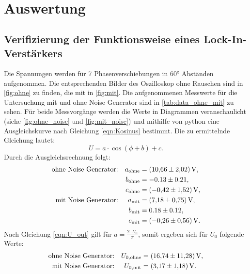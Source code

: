 \section{Auswertung}
\label{sec:Auswertung}

\subsection{Verifizierung der Funktionsweise eines Lock-In-Verstärkers}
\label{subsec:Verifizierung}
Die Spannungen werden für 7 Phasenverschiebungen in 60° Abständen aufgenommen.
Die entsprechenden Bilder des Oszilloskop ohne Rauschen sind in \autoref{fig:ohne} zu finden, die mit in \autoref{fig:mit}.
Die aufgenommenen Messwerte für die Untersuchung mit und ohne Noise Generator sind in \autoref{tab:data_ohne_mit} zu sehen.
Für beide Messvorgänge werden die Werte in Diagrammen veranschaulicht (siehe \autoref{fig:ohne_noise} und \autoref{fig:mit_noise}) und mithilfe von python eine Ausgleichskurve nach Gleichung \eqref{eqn:Kosinus} bestimmt.
Die zu ermittelnde Gleichung lautet:
\begin{equation*}
  U = a \cdot \cos(\phi + b) + c.
\end{equation*}
Durch die Ausgleichsrechnung folgt:
\begin{align*}
  \text{ohne Noise Generator:}&  &a_\text{ohne} &= \SI{10.66 \pm 2.02}{\volt}, \\
                              &  &b_\text{ohne} &= -0.13 \pm 0.21, \\
                              &  &c_\text{ohne} &= \SI{-0.42 \pm 1.52}{\volt}, \\
  \text{mit Noise Generator:}&   &a_\text{mit}  &= \SI{7.18 \pm 0.75}{\volt}, \\
                            &    &b_\text{mit} &=  0.18 \pm 0.12, \\
                            &    &c_\text{mit} &= \SI{-0.26 \pm 0.56}{\volt}.
\end{align*}
Nach Gleichung \eqref{eqn:U_out} gilt für $a = \frac{2 \cdot U_0}{\pi}$, somit ergeben sich für $U_0$ folgende Werte:
\begin{align*}
  \text{ohne Noise Generator:}&  &U_{0,\text{ohne}} &= \SI{16.74 \pm 11.28}{\volt}, \\
  \text{mit Noise Generator:}&   &U_{0,\text{mit}}  &= \SI{ 3.17 \pm 1.18}{\volt}.
\end{align*}

